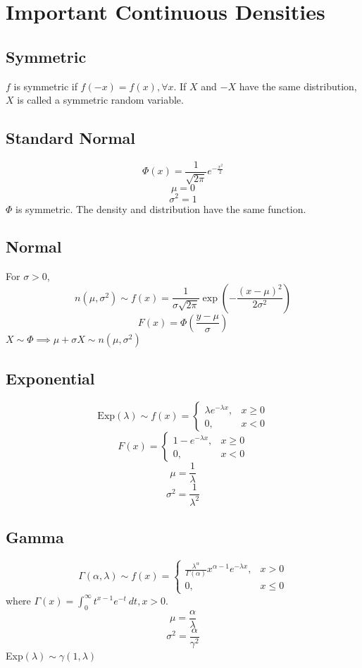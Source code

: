 \documentclass[10pt, a4paper]{extarticle}
\theoremstyle{definition}
\begin{document}
\section{Important Continuous Densities}
\subsection{Symmetric}
$f$ is symmetric if $f(-x)=f(x),\forall x$. If $X$ and $-X$ have the same distribution, $X$ is called a symmetric random variable.

\subsection{Standard Normal}
\[\Phi(x)=\frac{1}{\sqrt{2\pi}}e^{-\frac{x^2}{2}}\]
\[\mu=0\]
\[\sigma^2=1\]
$\Phi$ is symmetric. The density and distribution have the same function.

\subsection{Normal}
For $\sigma>0$,
\[n(\mu,\sigma^2)\sim f(x)=\frac{1}{\sigma\sqrt{2\pi}}\exp\left(-\frac{(x-\mu)^2}{2\sigma^2}\right)\]
\[F(x)=\Phi\left(\frac{y-\mu}{\sigma}\right)\]
$X\sim \Phi\implies \mu+\sigma X\sim n(\mu,\sigma^2)$

\subsection{Exponential}
\[\text{Exp}(\lambda)\sim f(x)=
	\begin{cases}
		\lambda e^{-\lambda x}, & x\geq 0 \\
		0,                      & x<0
	\end{cases}
\]
\[F(x)=
	\begin{cases}
		1- e^{-\lambda x}, & x\geq 0 \\
		0,                 & x<0
	\end{cases}
\]
\[\mu=\frac{1}{\lambda}\]
\[\sigma^2=\frac{1}{\lambda^2}\]

\subsection{Gamma}
\[\Gamma(\alpha,\lambda)\sim f(x)=
	\begin{cases}
		\frac{\lambda^\alpha}{\Gamma(\alpha)}x^{\alpha-1} e^{-\lambda x}, & x> 0    \\
		0,                                                                & x\leq 0
	\end{cases}
\]
where $\Gamma(x)=\int_0^\infty t^{x-1}e^{-t}\ dt, x>0$.
\[\mu=\frac{\alpha}{\lambda}\]
\[\sigma^2=\frac{\alpha}{\gamma^2}\]
Exp$(\lambda)\sim \gamma(1,\lambda)$
\end{document}
